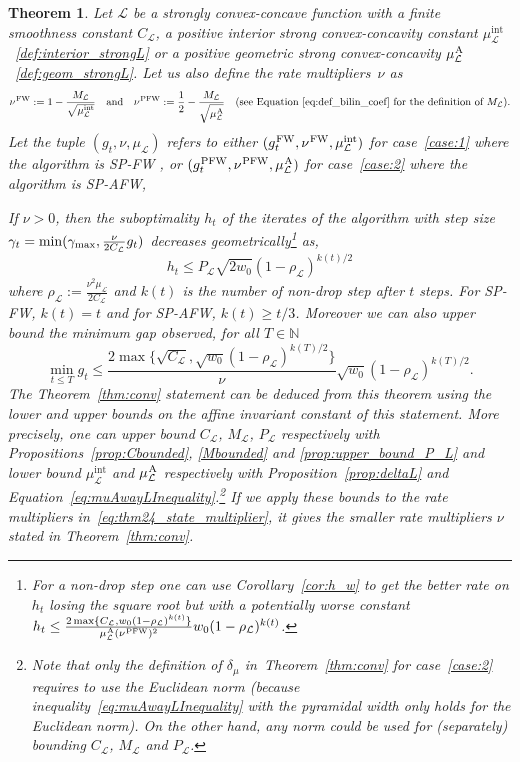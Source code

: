 \documentclass[twoside]{article}
\newcommand{\N}{\mathbb{N}}
\renewcommand{\L}{\mathcal{L}}
\newcommand{\gap}{g_{t}}
\newcommand{\CondNumb}{\nu}
\newtheorem{theorem}[definition]{Theorem}
\newcommand{\stepsize}{\gamma}
\newcommand{\stepmax}{\stepsize_{\textnormal{\scriptsize max}}} %
\newcommand{\FW}{{\hspace{0.05em}\textnormal{FW}}}
\newcommand{\PW}{{\hspace{0.05em}\textnormal{PFW}}}
\newcommand{\away}{{\hspace{0.05em}\textnormal{A}}}
\newcommand{\muIntL}{\mu^{\text{int}}_\L} %
\newcommand{\0}{\mathbf{0}} %
\begin{document}
  \begin{theorem}\label{thm:conv_affine_invariant}
  Let $\L$ be a 
    strongly convex-concave function with a finite smoothness constant $C_\L$, a positive interior strong convex-concavity constant $\muIntL$~\eqref{def:interior_strongL} or a positive geometric strong convex-concavity $\mu^{\away}_\L$~\eqref{def:geom_strongL}. Let us also define the rate multipliers~$\CondNumb$ as
  \begin{equation}\label{eq:thm24_state_multiplier}
    \CondNumb^{\FW} :=1- \frac{M_\L }{\sqrt{\muIntL}} \quad\text{and}\quad \CondNumb^{\PW} := \frac{1}{2}- \frac{M_\L }{\sqrt{\mu^{\away}_\L}} \quad(\text{see Equation~\eqref{eq:def_bilin_coef} for the definition of } M_\L).
  \end{equation}
    Let the tuple $(\gap,\CondNumb,\mu_\L)$ refers to
  either $(\gap^{\FW},\CondNumb^{\FW},\muIntL)$ for case~\eqref{case:1} where the algorithm is SP-FW , or $(\gap^{\PW},\CondNumb^{\PW},\mu^{\away}_\L)$ for case~\eqref{case:2} where the algorithm is SP-AFW,

  If $\CondNumb>0$, then the suboptimality $h_t$ of the iterates of the algorithm with
  step size $\stepsize_t = \min(\stepmax, \frac{\CondNumb}{2C_\L}\gap)$ decreases
  geometrically\footnote{For a non-drop step one can use Corollary~\ref{cor:h_w} to get the better rate on $h_t$ losing the square root but with a potentially worse constant $ h_t \leq \frac{2\max \{C_\L,w_0(1-\rho_\L)^{k(t)}\}}{\mu^{\away}_\L (\CondNumb^\PW)^2} w_0(1-\rho_\L)^{k(t)}$.} as,
        \begin{equation} 
          h_t \leq P_\L \sqrt{2w_0}(1- \rho_\L)^{k(t)/2}
        \end{equation}
  where $\rho_\L := \frac{\CondNumb^2\mu_\L }{2C_\L}$ and $k(t)$ is the number of non-drop step after $t$ steps. For SP-FW, $k(t)=t$ and for SP-AFW, $k(t)\geq t/3$. Moreover we can also upper bound the minimum gap observed, for all $T \in \N$
  \begin{equation}
    \min_{t \leq T} \gap \leq \frac{2\max\{\sqrt{C_\L},\sqrt{w_0} (1-\rho_\L)^{k(T)/2}\}}{\CondNumb{}} \sqrt{w_0} \left( 1- \rho_\L \right)^{k(T)/2}.
  \end{equation}
  The Theorem~\ref{thm:conv} statement can be deduced from this theorem using the lower and upper bounds on the affine invariant constant of this statement. More precisely, one can upper bound $C_\L$, $M_\L$, $P_\L$ respectively with Propositions~\ref{prop:Cbounded}, \ref{Mbounded} and \ref{prop:upper_bound_P_L} and lower bound $\muIntL$ and $\mu^{\away}_\L$ respectively with Proposition~\ref{prop:deltaL} and Equation~\eqref{eq:muAwayLInequality}.\footnote{Note that only the definition of $\delta_\mu$ in~Theorem~\ref{thm:conv} for case~\eqref{case:2} requires to use the Euclidean norm (because inequality~\eqref{eq:muAwayLInequality} with the pyramidal width only holds for the Euclidean norm). On the other hand, any norm could be used for (separately) bounding $C_\L$, $M_\L$ and $P_\L$.} 
  If we apply these bounds to the rate multipliers in~\eqref{eq:thm24_state_multiplier}, it gives the smaller rate multipliers $\CondNumb$ stated in Theorem~\ref{thm:conv}. 
  \end{theorem}
\end{document}
